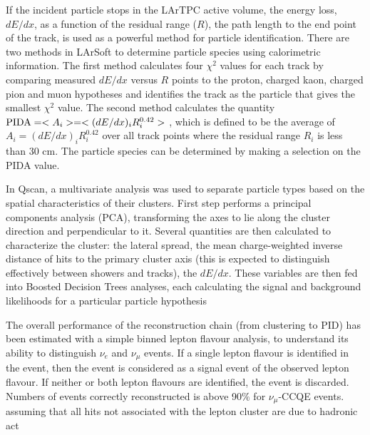 
If the incident particle stops in the LArTPC active volume, the energy
loss, $dE/dx$, as a function of the residual range ($R$), the path
length to the end point of the track, is used as a powerful method for
particle identification. There are two methods in LArSoft to determine
particle species using calorimetric information. The first method
calculates four $\chi^{2}$ values for each track by comparing measured
$dE/dx$ versus $R$ points to the proton, charged kaon, charged pion
and muon hypotheses and identifies the track as the particle that
gives the smallest $\chi^{2}$ value. The second method calculates the
quantity ${\rm{PIDA}} = <A_{i}> = <(dE/dx)_{i}R_{i}^{0.42}>$ \cite{box},
which is defined to be the average of $A_{i} =
(dE/dx)_{i}R_{i}^{0.42}$ over all track points where the residual
range $R_{i}$ is less than 30 cm. The particle species can be
determined by making a selection on the PIDA value.


In Qscan, a multivariate analysis was used to separate particle types based on the spatial characteristics of their clusters.
First step performs a principal components analysis (PCA), transforming the axes to lie along the 
cluster direction and perpendicular to it. Several quantities are then calculated to 
characterize the cluster: the lateral spread, the mean charge-weighted inverse distance of hits to the primary cluster axis
(this is expected to distinguish effectively between showers and tracks), the $dE/dx$.
These variables are then fed into Boosted Decision Trees analyses, 
each calculating the signal and background likelihoods for a particular particle hypothesis

The overall performance of the reconstruction chain (from clustering to PID) has been estimated with a simple binned lepton flavour analysis, 
to understand its ability to distinguish $\nu_{e}$ and $\nu_{\mu}$ events.
If a single lepton flavour is identified in the event, then the event is considered as a signal event of the observed lepton flavour. 
If neither or both lepton flavours are identified, the event is discarded.
Numbers of events correctly reconstructed is above 90$\%$ for $\nu_{\mu}$-CCQE events.
assuming that all hits not associated with the lepton cluster are due to hadronic act%

